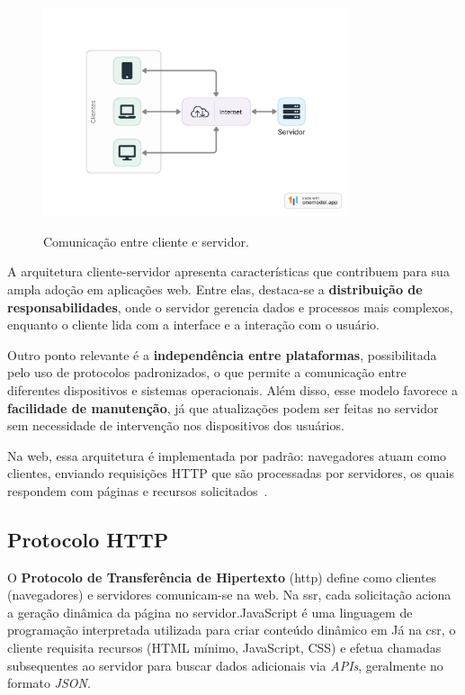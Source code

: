 \begin{figure}[H]
  \centering
  \caption{Comunicação entre cliente e servidor.}
  \includegraphics[width=0.8\textwidth]{media/cliente_servidor.jpeg}
  \label{fig:cliente-servidor}
\end{figure}


A arquitetura cliente-servidor apresenta características que contribuem para sua ampla adoção em aplicações web. Entre elas, destaca-se a \textbf{distribuição de responsabilidades}, onde o servidor gerencia dados e processos mais complexos, enquanto o cliente lida com a interface e a interação com o usuário. 

Outro ponto relevante é a \textbf{independência entre plataformas}, possibilitada pelo uso de protocolos padronizados, o que permite a comunicação entre diferentes dispositivos e sistemas operacionais. Além disso, esse modelo favorece a \textbf{facilidade de manutenção}, já que atualizações podem ser feitas no servidor sem necessidade de intervenção nos dispositivos dos usuários.

Na web, essa arquitetura é implementada por padrão: navegadores atuam como clientes, enviando requisições HTTP que são processadas por servidores, os quais respondem com páginas e recursos solicitados~\cite{fundamentosDevWeb}.


\subsection{Protocolo HTTP}
\label{subsec:http}
O \textbf{Protocolo de Transferência de Hipertexto} (\acrshort{http}) define como clientes (navegadores) e servidores comunicam-se na web. Na \acrshort{ssr}, cada solicitação aciona a geração dinâmica da página no servidor.JavaScript é uma linguagem de programação interpretada utilizada para criar conteúdo dinâmico em Já na \acrshort{csr}, o cliente requisita recursos (HTML mínimo, JavaScript, CSS) e efetua chamadas subsequentes ao servidor para buscar dados adicionais via \textit{APIs}, geralmente no formato \textit{JSON}.

